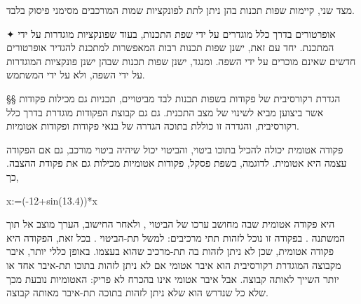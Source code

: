 מצד שני, קיימות שפות תכנות בהן ניתן לתת לפונקציות שמות המורכבים מסימני פיסוק
בלבד.

✦ אופרטורים בדרך כלל מוגדרים על ידי שפת התכנות, בעוד שפונקציות מוגדרות על ידי
המתכנת. יחד עם זאת, ישנן שפות תכנות רבות המאפשרות למתכנת להגדיר אופרטורים
חדשים שאינם מוכרים על ידי השפה. ומנגד, ישנן שפות תכנות שבהן ישנן פונקציות
המוגדרות על ידי השפה, ולא על ידי המשתמש.

§§ הגדרת רקורסיבית של פקודות בשפות תכנות
לבד מביטויים, תכניות גם מכילות פקודות אשר ביצוען מביא לשינוי של מצב התכנית. גם
גם קבוצת הפקודות מוגדרת בדרך כלל רקורסיבית, והגדרה זו כוללת בתוכה
הגדרה של בנאי פקודות ופקודות אטומיות.

פקודה אטומית יכולה להכיל בתוכו ביטוי, והביטוי יכול שיהיה ביטוי מורכב, גם אם
הפקודה עצמה היא אטומית.
לדוגמה, בשפת פסקל, פקודות אטומיות מכילות גם את פקודת ההצבה. כך,
\begin{PASCAL}
x:=(-12+sin(13.4))*x
\end{PASCAL}
היא פקודה אטומית שבה מחושב ערכו של הביטוי ,
ולאחר החישוב, הערך מוצב אל תוך המשתנה .
בפקודה זו נוכל לזהות תתי מרכיבים: למשל תת-הביטוי .
בכל זאת, הפקודה היא פקודה אטומית, שכן לא ניתן לזהות בה תת-מרכיב שהוא 
בעצמו. באופן כללי יותר, איבר מקבוצה המוגדרת רקורסיבית הוא איבר אטומי אם
לא ניתן לזהות בתוכו תת-איבר אחד או יותר השייך לאותה קבוצה. אבל איבר אטומי אינו
בהכרח לא פריק: האטומיות נובעת מכך שלא כל שנדרש הוא שלא ניתן לזהות בתוכה תת-איבר
מאותה קבוצה.

